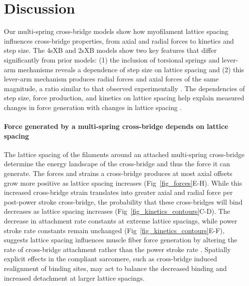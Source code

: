 \documentclass[10pt]{article}
\newcommand{\citep}[1]{\cite{#1}} %
\begin{document}


\section*{Discussion} %

Our multi-spring cross-bridge models show how myofilament lattice spacing influences cross-bridge properties, from axial and radial forces to kinetics and step size. 
The 4sXB and 2sXB models show two key features that differ significantly from prior models: (1) the inclusion of torsional springs and lever-arm mechanisms reveals a dependence of step size on lattice spacing and (2) this lever-arm mechanism produces radial forces and axial forces of the same magnitude, a ratio similar to that observed experimentally \citep{Maughan1981, Cecchi1990, Brenner1991}. 
The dependencies of step size, force production, and kinetics on lattice spacing help explain measured changes in force generation with changes in lattice spacing \citep{Millman1998}. 

\paragraph{Force generated by a multi-spring cross-bridge depends on lattice spacing} %
The lattice spacing of the filaments around an attached multi-spring cross-bridge determine the energy landscape of the cross-bridge and thus the force it can generate. 
The forces and strains a cross-bridge produces at most axial offsets grow more positive as lattice spacing increases (Fig~\ref{fig_forces}E-H). 
While this increased cross-bridge strain translates into greater axial and radial force per post-power stroke cross-bridge, the probability that these cross-bridges will bind decreases as lattice spacing increases (Fig~\ref{fig_kinetics_contours}C-D).
The decrease in attachment rate constants at extreme lattice spacings, while power stroke rate constants remain unchanged (Fig~\ref{fig_kinetics_contours}E-F), suggests lattice spacing influences muscle fiber force generation by altering the rate of cross-bridge attachment rather than the power stroke rate \citep{Martyn2004}. 
Spatially explicit effects in the compliant sarcomere, such as cross-bridge induced realignment of binding sites, may act to balance the decreased binding and increased detachment at larger lattice spacings.
\end{document}

